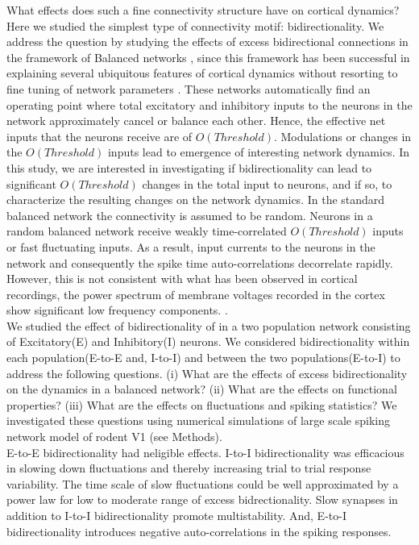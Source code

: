 What effects does such a fine connectivity structure have on cortical dynamics? Here we studied the simplest type of connectivity motif: bidirectionality. We address the question by studying the effects of excess bidirectional connections in the framework of Balanced networks \cite{carl1996, carl1998, carl2004}, since this framework has been successful in explaining several ubiquitous features of cortical dynamics without resorting to fine tuning of network parameters \cite{softky1993, Holt1996, roxin2011}. These networks automatically find an operating point where total excitatory and inhibitory inputs to the neurons in the network approximately cancel or balance each other.  Hence, the effective net inputs that the neurons receive are of $O(Threshold)$. Modulations or changes in the $O(Threshold)$ inputs lead to emergence of interesting network dynamics. In this study, we are interested in investigating if bidirectionality can lead to significant $O(Threshold)$ changes in the total input to neurons, and if so, to characterize the resulting changes on the network dynamics. In the standard balanced network the connectivity is assumed to be random. Neurons in a random balanced network receive weakly time-correlated $O(Threshold)$ inputs or fast fluctuating inputs. As a result, input currents to the neurons in the network and consequently the spike time auto-correlations decorrelate rapidly\cite{carl1996, carl1998}. However, this is not consistent with what has been observed in cortical recordings, the power spectrum of membrane voltages recorded in the cortex show significant low frequency components. \cite{Tan2014}.\\	
	
We studied the effect of bidirectionality of in a two population network consisting of Excitatory(E) and Inhibitory(I) neurons. We considered bidirectionality within each population(E-to-E and, I-to-I) and between the two populations(E-to-I) to address the following questions. (i) What are the effects of excess bidirectionality on the dynamics in a balanced network? (ii) What are the effects on functional properties? (iii) What are the effects on fluctuations and spiking statistics?
We investigated these questions using numerical simulations of large scale spiking network  model of rodent V1 (see Methods). \\
 
 E-to-E bidirectionality had neligible effects. I-to-I bidirectionality was efficacious in slowing down fluctuations and thereby increasing trial to trial response variability. The time scale of slow fluctuations could be well approximated by a power law for low to moderate range of excess bidrectionality. Slow synapses in addition to I-to-I bidirectionality promote multistability. And, E-to-I bidirectionality introduces negative auto-correlations in the spiking responses. 

